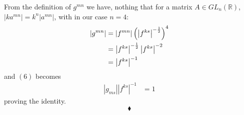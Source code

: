 From the definition of $g^{mn}$ we have, nothing that for a matrix $A \in GL_n(\mathbb{R})$, $\left|k a^{mn}\right| = k^n \left| a^{mn}\right|$, with in our case $n=4$:
\begin{align}
\left|g^{mn}\right| &= \left|f^{mn}\right|\left(\left|f^{ks}\right|^{-\frac{1}{2}}\right)^4\\
&=\left|f^{ks}\right|^{-\frac{1}{2}}\left|f^{ks}\right|^{-2}\\
&= \left|f^{ks}\right|^{-1}
\end{align}
and $(6)$ becomes
\begin{align}
\left|g_{ms}\right|\left|f^{ks}\right|^{-1}&= 1
\end{align}
proving the identity.
$$\blacklozenge$$
\newpage